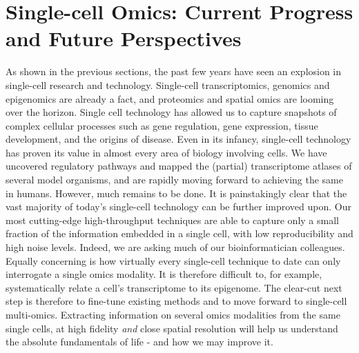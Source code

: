 \clearpage
\section{Single-cell Omics: Current Progress and Future Perspectives}
As shown in the previous sections, the past few years have seen an explosion in single-cell research and technology. Single-cell transcriptomics, genomics and epigenomics are already a fact, and proteomics and spatial omics are looming over the horizon. Single cell technology has allowed us to capture snapshots of complex cellular processes such as gene regulation, gene expression, tissue development, and the origins of disease. Even in its infancy, single-cell technology has proven its value in almost every area of biology involving cells. We have uncovered regulatory pathways and mapped the (partial) transcriptome atlases of several model organisms, and are rapidly moving forward to achieving the same in humans. However, much remains to be done. It is painstakingly clear that the vast majority of today's single-cell technology can be further improved upon. Our most cutting-edge high-throughput techniques are able to capture only a small fraction of the information embedded in a single cell, with low reproducibility and high noise levels. Indeed, we are asking much of our bioinformatician colleagues. Equally concerning is how virtually every single-cell technique to date can only interrogate a single omics modality. It is therefore difficult to, for example, systematically relate a cell's transcriptome to its epigenome. The clear-cut next step is therefore to fine-tune existing methods and to move forward to single-cell multi-omics. Extracting information on several omics modalities from the same single cells, at high fidelity \textit{and} close spatial resolution will help us understand the absolute fundamentals of life - and how we may improve it.\pms


